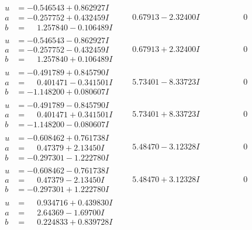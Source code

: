 \documentclass[1p]{elsarticle_modified}
\theoremstyle{definition}
\begin{document}
$$\begin{array}{c|c|c}
\begin{aligned}
u &= -0.546543 + 0.862927 I \\
a &= -0.257752 + 0.432459 I \\
b &= \phantom{-}1.257840 - 0.106489 I\end{aligned}
 & \phantom{-}0.67913 - 2.32400 I & \phantom{-0.000000 } 0 \\ \hline\begin{aligned}
u &= -0.546543 - 0.862927 I \\
a &= -0.257752 - 0.432459 I \\
b &= \phantom{-}1.257840 + 0.106489 I\end{aligned}
 & \phantom{-}0.67913 + 2.32400 I & \phantom{-0.000000 } 0 \\ \hline\begin{aligned}
u &= -0.491789 + 0.845790 I \\
a &= \phantom{-}0.401471 - 0.341501 I \\
b &= -1.148200 + 0.080607 I\end{aligned}
 & \phantom{-}5.73401 - 8.33723 I & \phantom{-0.000000 } 0 \\ \hline\begin{aligned}
u &= -0.491789 - 0.845790 I \\
a &= \phantom{-}0.401471 + 0.341501 I \\
b &= -1.148200 - 0.080607 I\end{aligned}
 & \phantom{-}5.73401 + 8.33723 I & \phantom{-0.000000 } 0 \\ \hline\begin{aligned}
u &= -0.608462 + 0.761738 I \\
a &= \phantom{-}0.47379 + 2.13450 I \\
b &= -0.297301 - 1.222780 I\end{aligned}
 & \phantom{-}5.48470 - 3.12328 I & \phantom{-0.000000 } 0 \\ \hline\begin{aligned}
u &= -0.608462 - 0.761738 I \\
a &= \phantom{-}0.47379 - 2.13450 I \\
b &= -0.297301 + 1.222780 I\end{aligned}
 & \phantom{-}5.48470 + 3.12328 I & \phantom{-0.000000 } 0 \\ \hline\begin{aligned}
u &= \phantom{-}0.934716 + 0.439830 I \\
a &= \phantom{-}2.64369 - 1.69700 I \\
b &= \phantom{-}0.224833 + 0.839728 I\end{aligned}

\end{array}$$
\end{document}
